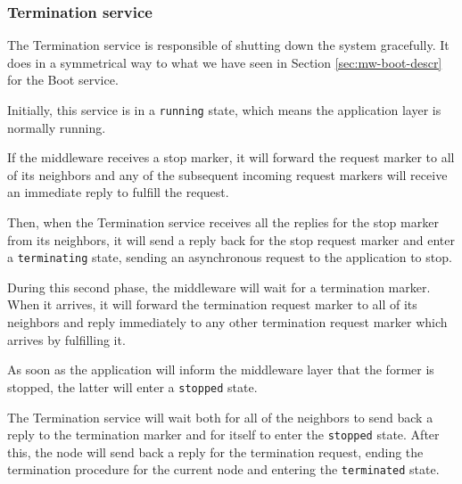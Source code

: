 \subsubsection{Termination service}

The Termination service is responsible of shutting down the system gracefully.
It does in a symmetrical way to what we have seen in Section
\ref{sec:mw-boot-descr} for the Boot service.

Initially, this service is in a \texttt{running} state, which means the
application layer is normally running.

If the middleware receives a stop marker, it will forward the request marker to
all of its neighbors and any of the subsequent incoming request markers will
receive an immediate reply to fulfill the request.

Then, when the Termination service receives all the replies for the stop marker
from its neighbors, it will send a reply back for the stop request marker and
enter a \texttt{terminating} state, sending an asynchronous request to the
application to stop.

During this second phase, the middleware will wait for a termination marker.
When it arrives, it will forward the termination request marker to all of its
neighbors and reply immediately to any other termination request marker which
arrives by fulfilling it.

As soon as the application will inform the middleware layer that the former is
stopped, the latter will enter a \texttt{stopped} state.

The Termination service will wait both for all of the neighbors to send back a
reply to the termination marker and for itself to enter the \texttt{stopped}
state.
After this, the node will send back a reply for the termination request, ending
the termination procedure for the current node and entering the
\texttt{terminated} state.

